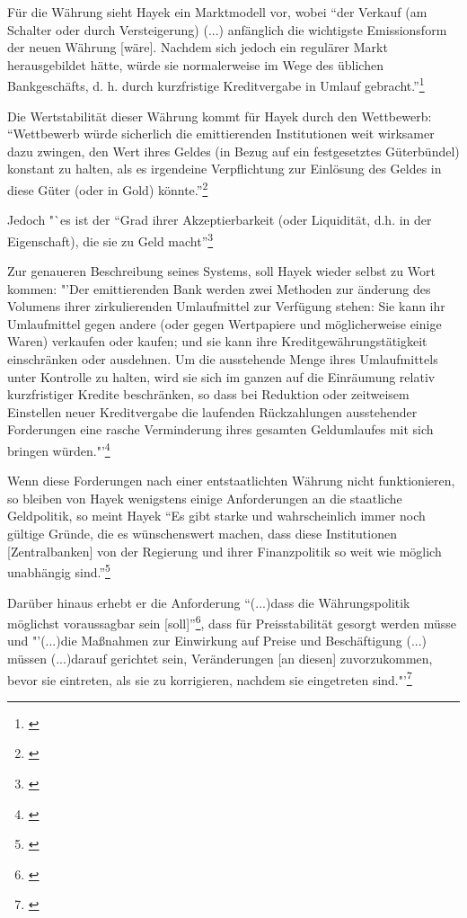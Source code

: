 \documentclass[
        onecolumn,
        a4paper,
        abstracton,
        parskip=half
        ,final
        ]{scrartcl}
\begin{document}
F{\"u}r die W{\"a}hrung sieht Hayek ein Marktmodell vor, wobei "`der Verkauf (am Schalter oder durch Versteigerung) (...) anf{\"a}nglich die wichtigste Emissionsform der neuen W{\"a}hrung [w{\"a}re]. Nachdem sich jedoch ein regul{\"a}rer Markt herausgebildet h{\"a}tte, w{\"u}rde sie normalerweise im Wege des {\"u}blichen Bankgesch{\"a}fts, d. h. durch kurzfristige Kreditvergabe in Umlauf gebracht."'\footnote[418]{\citep*[S.31]{Hayek1977}}

Die Wertstabilit{\"a}t dieser W{\"a}hrung kommt f{\"u}r Hayek durch den Wettbewerb: "`Wettbewerb w{\"u}rde sicherlich die emittierenden Institutionen weit wirksamer dazu zwingen, den Wert ihres Geldes (in Bezug auf ein festgesetztes G{\"u}terb{\"u}ndel) konstant zu halten, als es irgendeine Verpflichtung zur Einl{\"o}sung des Geldes in diese G{\"u}ter (oder in Gold) k{\"o}nnte."'\footnote[419]{\citep*[S.32]{Hayek1977}}

Jedoch "`es ist der "`Grad ihrer Akzeptierbarkeit (oder Liquidit{\"a}t, d.h. in der Eigenschaft), die sie zu Geld macht"'\footnote[420]{\citep*[S.40]{Hayek1977}}

Zur genaueren Beschreibung seines Systems, soll Hayek wieder selbst zu Wort kommen: "'Der emittierenden Bank werden zwei Methoden zur {\"a}nderung des Volumens ihrer zirkulierenden Umlaufmittel zur Verf{\"u}gung stehen: Sie kann ihr Umlaufmittel gegen andere (oder gegen Wertpapiere und m{\"o}glicherweise einige Waren) verkaufen oder kaufen; und sie kann ihre Kreditgew{\"a}hrungst{\"a}tigkeit einschr{\"a}nken oder ausdehnen. Um die ausstehende Menge ihres Umlaufmittels unter Kontrolle zu halten, wird sie sich im ganzen auf die Einr{\"a}umung relativ kurzfristiger Kredite beschr{\"a}nken, so dass bei Reduktion oder zeitweisem Einstellen neuer Kreditvergabe die laufenden R{\"u}ckzahlungen ausstehender Forderungen eine rasche Verminderung ihres gesamten Geldumlaufes mit sich bringen w{\"u}rden."'\footnote[421]{\citep*[S.45]{Hayek1977}}

Wenn diese Forderungen nach einer entstaatlichten W{\"a}hrung nicht funktionieren, so bleiben von Hayek wenigstens einige Anforderungen an die staatliche Geldpolitik, so meint Hayek
"`Es gibt starke und wahrscheinlich immer noch g{\"u}ltige Gr{\"u}nde, die es w{\"u}nschenswert machen, dass diese Institutionen [Zentralbanken] von der Regierung und ihrer Finanzpolitik so weit wie m{\"o}glich unabh{\"a}ngig sind."'\footnote[422]{\citep*[S.412]{hayek1971}}

Dar{\"u}ber hinaus erhebt er die Anforderung "`(...)dass die W{\"a}hrungspolitik m{\"o}glichst voraussagbar sein [soll]"'\footnote[423]{\citep*[S.420]{hayek1971}}, dass f{\"u}r Preisstabilit{\"a}t gesorgt werden m{\"u}sse und "'(...)die Maßnahmen zur Einwirkung auf Preise und Besch{\"a}ftigung (...) m{\"u}ssen (...)darauf gerichtet sein, Ver{\"a}nderungen [an diesen] zuvorzukommen, bevor sie eintreten, als sie zu korrigieren, nachdem sie eingetreten sind."'\footnote[425]{\citep*[S.422]{hayek1971}}
\end{document}
